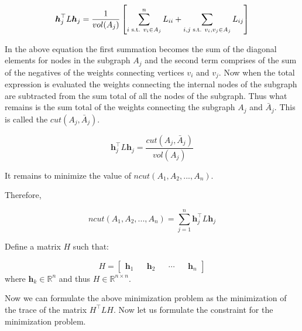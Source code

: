 \documentclass[english]{article}
\theoremstyle{plain}
\begin{document}
\begin{equation}
\boldsymbol{h}_{j}^{\top}L\boldsymbol{h}_{j} = \frac{1}{vol(A_{j})}\left[\sum_{i \textnormal{ s.t. } v_{i} \in A_{j}}^{n} L_{ii} + \sum_{i,j \textnormal{ s.t. }v_{i},v_{j} \in A_{j}} L_{ij}\right]
\end{equation}

In the above equation the first summation becomes the sum of the diagonal elements for nodes in the subgraph $A_{j}$ and the second term comprises of the sum of the negatives of the weights connecting vertices $v_{i}$ and $v_{j}$. Now when the total expression is evaluated the weights connecting the internal nodes of the subgraph are subtracted from the sum total of all the nodes of the subgraph. Thus what remains is the sum total of the weights connecting the subgraph $A_{j}$ and $\bar{A}_{j}$. This is called the $cut(A_{j},\bar{A}_{j})$.

\begin{equation}
\boldsymbol{h}_{j}^{\top}L\boldsymbol{h}_{j} = \frac{cut(A_{j},\bar{A}_{j})}{vol(A_{j})}
\end{equation}

It remains to minimize the value of $ncut(A_{1}, A_{2},...,A_{n})$.

Therefore,

\begin{equation}
ncut(A_{1}, A_{2},...,A_{n}) = \sum_{j=1}^{n} \boldsymbol{h}_{j}^{\top}L\boldsymbol{h}_{j}
\end{equation}

Define a matrix $H$ such that:

\begin{equation}
H=
\begin{bmatrix}
\boldsymbol{h}_{1} && \boldsymbol{h}_{2} && \cdots && \boldsymbol{h}_{n} 
\end{bmatrix}
\end{equation}
where $\boldsymbol{h}_{k} \in \mathbb{R}^{n} $
and thus $H \in \mathbb{R}^{n\times n}$.

Now we can formulate the above minimization problem as the minimization of the trace of the matrix $H^{\top}LH$. Now let us formulate the constraint for the minimization problem.
\end{document}
